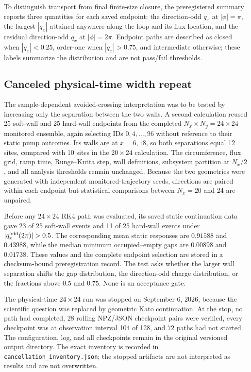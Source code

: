\documentclass[aps,prb,twocolumn,floatfix,nofootinbib,superscriptaddress]{revtex4-2}
\newcommand{\code}[1]{\texttt{#1}}
\begin{document}
To distinguish transport from final finite-size closure, the preregistered
summary reports three quantities for each saved endpoint: the direction-odd
$q_x$ at $|\phi|=\pi$, the largest $|q_x|$ attained anywhere along the loop
and its flux location, and the residual direction-odd $q_x$ at $|\phi|=2\pi$.
Endpoint paths are described as closed when $|q_x|<0.25$, order-one when
$|q_x|>0.75$, and intermediate otherwise; these labels summarize the
distribution and are not pass/fail thresholds.

\subsection{Canceled physical-time width repeat}

The sample-dependent avoided-crossing interpretation was to be tested by
increasing only the separation between the two walls.  A second calculation
reused 25
soft-wall and 25 hard-wall endpoints from the completed
$N_x\times N_y=24\times24$ monitored ensemble, again selecting IDs
$0,4,\ldots,96$ without reference to their static pump outcomes.  Its walls
are at $x=6,18$, so both separations equal 12 sites, compared with 10 sites in
the $20\times24$ calculation.  The circumference, flux grid, ramp time,
Runge--Kutta step, wall definitions, subsystem partition at $N_x/2$, and all
analysis thresholds remain unchanged.  Because the two geometries were
generated with independent monitored-trajectory seeds, directions are paired
within each endpoint but statistical comparisons between $N_x=20$ and 24 are
unpaired.

Before any $24\times24$ RK4 path was evaluated, its saved static continuation
data gave 23 of 25 soft-wall events and 11 of 25 hard-wall events under
$|q_x^{\rm odd}(2\pi)|>0.5$.  The corresponding mean static responses are
$0.91588$ and $0.43988$, while the median minimum occupied--empty gaps are
$0.00898$ and $0.01738$.  These values and the complete endpoint selection are
stored in a checksum-bound preregistration record.  The test asks whether the
larger wall separation shifts the gap distribution, the direction-odd charge
distribution, or the fractions above $0.5$ and $0.75$.  None is an acceptance
gate.

The physical-time $24\times24$ run was stopped on September 6, 2026, because
the scientific question was replaced by geometric Kato continuation.  At the
stop, no path had completed, 28 rolling NPZ/JSON checkpoint pairs were
verified, every checkpoint was at observation interval 104 of 128, and 72
paths had not started.  The configuration, log, and all checkpoints remain in
the original versioned output directory.  The exact inventory is recorded in
\code{cancellation\_inventory.json}; the stopped artifacts are not interpreted
as results and are not overwritten.
\end{document}
